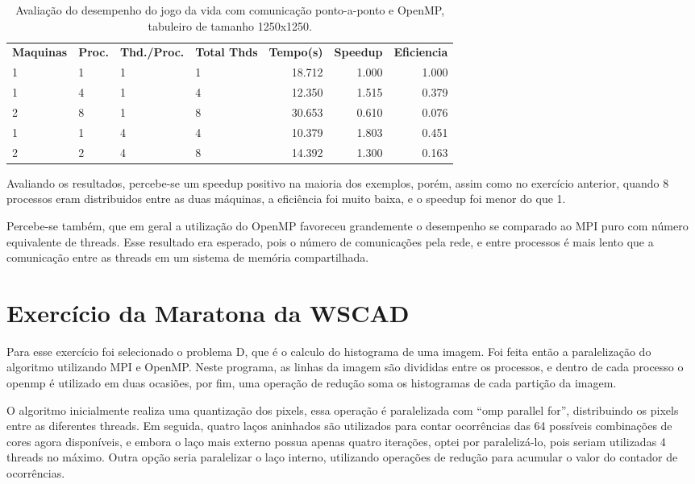 \documentclass[conference]{IEEEtran}
\begin{document}
\begin{table}[htb!]
  \centering
	\begin{adjustbox}{max width=\linewidth}
	\begin{tabular}{llllrrr}%
		\bfseries Maquinas & \bfseries Proc. & \bfseries Thd./Proc. & \bfseries Total Thds & \bfseries Tempo(s) & \bfseries Speedup & \bfseries Eficiencia \\
    1	& 1	& 1	& 1	& 18.712 & 1.000 & 1.000 \\
    1	& 4	& 1	& 4	& 12.350 & 1.515 & 0.379 \\
    2	& 8	& 1	& 8	& 30.653 & 0.610 & 0.076 \\
    1	& 1	& 4	& 4	& 10.379 & 1.803 & 0.451 \\
    2	& 2	& 4	& 8	& 14.392 & 1.300 & 0.163 \\
	\end{tabular}
	\end{adjustbox}
	\caption{\label{tab:ex03}Avaliação do desempenho do jogo da vida com comunicação ponto-a-ponto e OpenMP, tabuleiro de tamanho 1250x1250.}
\end{table}

Avaliando os resultados, percebe-se um speedup positivo na maioria dos exemplos, porém, assim como no exercício anterior, quando 8 processos eram distribuidos entre as duas máquinas, a eficiência foi muito baixa, e o speedup foi menor do que 1.

Percebe-se também, que em geral a utilização do OpenMP favoreceu grandemente o desempenho se comparado ao MPI puro com número equivalente de threads. Esse resultado era esperado, pois o número de comunicações pela rede, e entre processos é mais lento que a comunicação entre as threads em um sistema de memória compartilhada.

\section{Exercício da Maratona da WSCAD}
Para esse exercício foi selecionado o problema D, que é o calculo do histograma de uma imagem. Foi feita então a paralelização do algoritmo utilizando MPI e OpenMP.  Neste programa, as linhas da imagem são divididas entre os processos, e dentro de cada processo o openmp é utilizado em duas ocasiões, por fim, uma operação de redução soma os histogramas de cada partição da imagem.

O algoritmo inicialmente realiza uma quantização dos pixels, essa operação é paralelizada com ``omp parallel for'', distribuindo os pixels entre as diferentes threads.
Em seguida, quatro laços aninhados são utilizados para contar ocorrências das 64 possíveis combinações de cores agora disponíveis, e embora o laço mais externo possua apenas quatro iterações, optei por paralelizá-lo, pois seriam utilizadas 4 threads no máximo.
Outra opção seria paralelizar o laço interno, utilizando operações de redução para acumular o valor do contador de ocorrências.
\end{document}
